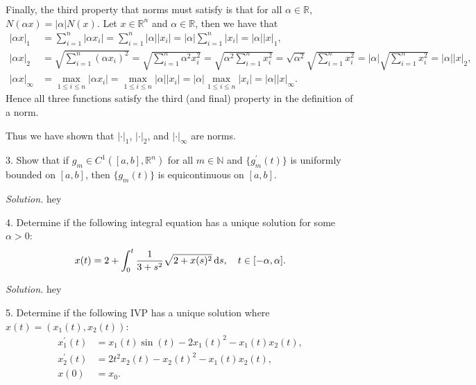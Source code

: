 \documentclass{article}
\newcommand{\N}{\mathbb{N}}
\newcommand{\R}{\mathbb{R}}
\begin{document}
Finally, the third property that norms must satisfy is that for all $\alpha \in \R$,
$N(\alpha x) = |\alpha| N(x)$. Let $x \in \R^n$ and $\alpha \in \R$, then we have that
%
\begin{align*}
    |\alpha x|_1
        &= \sum_{i = 1}^n |\alpha x_i|
        = \sum_{i = 1}^n |\alpha| |x_i|
        = |\alpha| \sum_{i = 1}^n |x_i|
        = |\alpha| |x|_1
        , \\
    |\alpha x|_2
        &= \sqrt{\sum_{i = 1}^n (\alpha x_i)^2}
        = \sqrt{\sum_{i = 1}^n \alpha^2 x_i^2}
        = \sqrt{\alpha^2 \sum_{i = 1}^n x_i^2}
        = \sqrt{\alpha^2} \sqrt{\sum_{i = 1}^n x_i^2}
        = |\alpha| \sqrt{\sum_{i = 1}^n x_i^2}
        = |\alpha| |x|_2
        , \\
    |\alpha x|_\infty
        &= \max_{1 \leq i \leq n} |\alpha x_i|
        = \max_{1 \leq i \leq n} |\alpha| |x_i|
        = |\alpha| \max_{1 \leq i \leq n} |x_i|
        = |\alpha| |x|_\infty
        .
\end{align*}
%
Hence all three functions satisfy the third (and final) property in the definition of a norm.

Thus we have shown that $|\cdot|_1$, $|\cdot|_2$, and $|\cdot|_\infty$ are norms.

\newpage

3. Show that if $g_m \in C^1([a, b], \R^n)$ for all $m \in \N$ and $\{g_m^\prime(t)\}$
is uniformly bounded on $[a, b]$, then $\{g_m(t)\}$ is equicontinuous on $[a, b]$.

\textit{Solution.}
hey

\newpage

4. Determine if the following integral equation has a unique solution for some $\alpha > 0$:
%
\begin{equation*}
    x(t) = 2 + \int_0^t \frac{1}{3 + s^2} \sqrt{2 + x(s)^2} \dif s, \quad t \in [-\alpha, \alpha]
    .
\end{equation*}

\textit{Solution.}
hey

\newpage

5. Determine if the following IVP has a unique solution where $x(t) = (x_1(t), x_2(t))$:
%
\begin{align*}
    x_1^\prime(t) &= x_1(t) \sin(t) - 2 x_1(t)^2 - x_1(t) x_2(t), \\
    x_2^\prime(t) &= 2 t^2 x_2(t) - x_2(t)^2 - x_1(t) x_2(t), \\
    x(0) &= x_0.
\end{align*}
\end{document}
